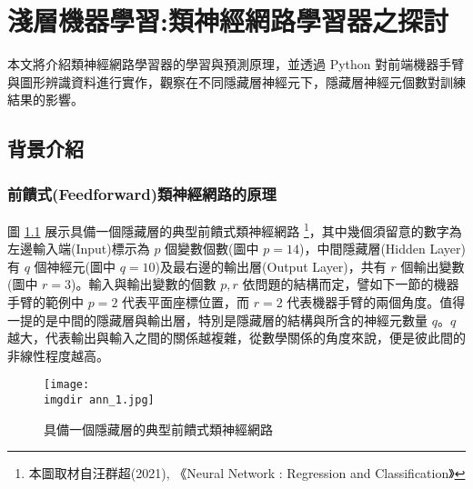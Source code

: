 %   
%

\chapter{淺層機器學習:類神經網路學習器之探討}
本文將介紹類神經網路學習器的學習與預測原理，並透過 Python 對前端機器手臂與圖形辨識資料進行實作，觀察在不同隱藏層神經元下，隱藏層神經元個數對訓練結果的影響。

\section{背景介紹}
\subsection{前饋式(Feedforward)類神經網路的原理}

圖 \ref{fig:ann_1} 展示具備一個隱藏層的典型前饋式類神經網路 \footnote{本圖取材自汪群超(2021), 《Neural Network : Regression and Classification》}，其中幾個須留意的數字為左邊輸入端(Input)標示為 $p$ 個變數個數(圖中 $p = 14$)，中間隱藏層(Hidden Layer)有 $q$ 個神經元(圖中 $q = 10$)及最右邊的輸出層(Output Layer)，共有 $r$ 個輸出變數(圖中 $r = 3$)。輸入與輸出變數的個數 $p, r$ 依問題的結構而定，譬如下一節的機器手臂的範例中 $p = 2$ 代表平面座標位置，而 $r = 2$ 代表機器手臂的兩個角度。值得一提的是中間的隱藏層與輸出層，特別是隱藏層的結構與所含的神經元數量 $q$。$q$ 越大，代表輸出與輸入之間的關係越複雜，從數學關係的角度來說，便是彼此間的非線性程度越高。

\begin{figure}[H]
    \centering
        \texttt{[image: \\imgdir ann\_1.jpg]}
    \caption{具備一個隱藏層的典型前饋式類神經網路}
    \label{fig:ann_1}
\end{figure}

